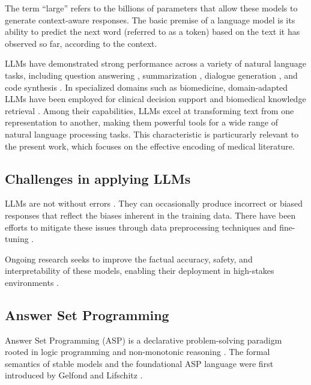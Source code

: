 \documentclass[10pt,leqno]{amsart}
\begin{document}
The term “large” refers to the billions of parameters 
that allow these models to generate context-aware responses. 
The basic premise of a language model is its ability to predict 
the next word (referred to as a token) based on the text it has observed so far, 
according to the context.


LLMs have demonstrated strong performance across a variety of natural language tasks, 
including question answering \cite{Brown2020}, summarization \cite{Zhang2020}, 
dialogue generation \cite{Thoppilan2022lamda}, and code synthesis \cite{Chen2021}. 
In specialized domains such as biomedicine, domain-adapted LLMs have been employed 
for clinical decision support \cite{Singhal2023} and 
biomedical knowledge retrieval \cite{Luo2022}.
Among their capabilities, LLMs excel at transforming text from one representation to another, 
making them powerful tools for a wide range of natural language processing tasks. 
This characteristic is particurarly relevant to the present work, 
which focuses on the effective encoding of medical literature. 

\subsection{Challenges in applying LLMs}

LLMs are not without errors \cite{Raj2023, Ruis2023}. 
They can occasionally produce incorrect or biased responses 
that reflect the biases inherent in the training data. 
There have been efforts to mitigate these issues 
through data preprocessing techniques and fine-tuning \cite{Dodge2021}.

Ongoing research seeks to improve the factual accuracy, safety, and interpretability 
of these models, enabling their deployment in high-stakes environments \cite{Ganguli2022}.

\subsection{Answer Set Programming}

Answer Set Programming (ASP) \cite{Eiter2009} is a declarative problem-solving paradigm 
rooted in logic programming and non-monotonic reasoning \cite{Brewka2011}. 
The formal semantics of stable models and the foundational ASP language 
were first introduced by Gelfond and Lifschitz \cite{Gelfond2000, gel88}.
\end{document}
